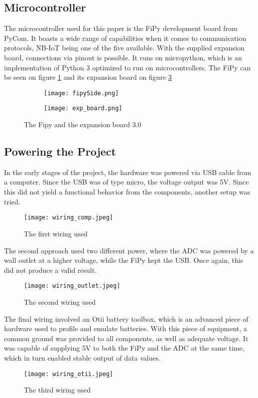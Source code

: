 \subsection{Microcontroller}
The microcontroller used for this paper is the FiPy development board from PyCom. It boasts a wide range of capabilities when it comes to communication protocols, NB-IoT being one of the five available.\cite{fipy-docs} With the supplied expansion board, connections via pinout is possible. It runs on micropython, which is an implementation of Python 3 optimized to run on microcontrollers.\cite{micropython} The FiPy can be seen on figure \ref{fig:fipySide} and its expansion board on figure \ref{fig:exp_board}
\begin{figure}[H]
\begin{subfigure}{0.5\textwidth}
	\centering
	\texttt{[image: fipySide.png]}
	\caption{}
	\label{fig:fipySide}
\end{subfigure}
%
\begin{subfigure}{0.5\textwidth}
	\centering
	\texttt{[image: exp\_board.png]}
	\caption{}
	\label{fig:exp_board}
\end{subfigure}
\caption{The Fipy and the expansion board 3.0}
\end{figure}

\subsection{Powering the Project}
In the early stages of the project, the hardware was powered via USB cable from a computer. Since the USB was of type micro, the voltage output was 5V. Since this did not yield a functional behavior from the components, another setup was tried.
\begin{figure}[h]
	\centering
	\texttt{[image: wiring\_comp.jpeg]}
	\caption{The first wiring used\cite{lucid-chart}}
	\label{fig:wiring_comp}
\end{figure}

The second approach used two different power, where the ADC was powered by a wall outlet at a higher voltage, while the FiPy kept the USB. Once again, this did not produce a valid result.
\begin{figure}[H]
	\centering
	\texttt{[image: wiring\_outlet.jpeg]}
	\caption{The second wiring used\cite{lucid-chart}}
	\label{fig:wiring_outlet}
\end{figure}

The final wiring involved an Otii battery toolbox, which is an advanced piece of hardware used to profile and emulate batteries.\cite{otii-web} With this piece of equipment, a common ground was provided to all components, as well as adequate voltage. It was capable of supplying 5V to both the FiPy and the ADC at the same time, which in turn enabled stable output of data values. 
\begin{figure}[H]
	\centering
	\texttt{[image: wiring\_otii.jpeg]}
	\caption{The third wiring used\cite{lucid-chart}}
	\label{fig:wiring_otii}
\end{figure}

